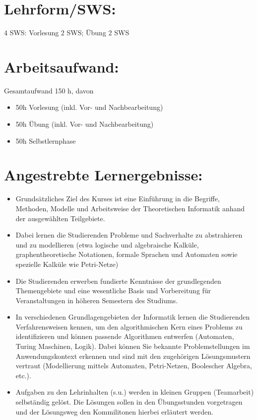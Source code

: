 \section*{Lehrform/SWS:}\label{lehrformsws-23}

4 SWS: Vorlesung 2 SWS; Übung 2 SWS

\section*{Arbeitsaufwand:}\label{arbeitsaufwand-22}

Gesamtaufwand 150 h, davon

\begin{itemize}
\item
  50h Vorlesung (inkl. Vor- und Nachbearbeitung)
\item
  50h Übung (inkl. Vor- und Nachbearbeitung)
\item
  50h Selbstlernphase
\end{itemize}

\section*{Angestrebte
Lernergebnisse:}\label{angestrebte-lernergebnisse-23}

\begin{itemize}
\item
  Grundsätzliches Ziel des Kurses ist eine Einführung in die Begriffe,
  Methoden, Modelle und Arbeitsweise der Theoretischen Informatik anhand
  der ausgewählten Teilgebiete.
\item
  Dabei lernen die Studierenden Probleme und Sachverhalte zu
  abstrahieren und zu modellieren (etwa logische und algebraische
  Kalküle, graphentheoretische Notationen, formale Sprachen und
  Automaten sowie spezielle Kalküle wie Petri-Netze)
\item
  Die Studierenden erwerben fundierte Kenntnisse der grundlegenden
  Themengebiete und eine wesentliche Basis und Vorbereitung für
  Veranstaltungen in höheren Semestern des Studiums.
\item
  In verschiedenen Grundlagengebieten der Informatik lernen die
  Studierenden Verfahrensweisen kennen, um den algorithmischen Kern
  eines Problems zu identifizieren und können passende Algorithmen
  entwerfen (Automaten, Turing Maschinen, Logik). Dabei können Sie
  bekannte Problemstellungen im Anwendungskontext erkennen und sind mit
  den zugehörigen Lösungsmustern vertraut (Modellierung mittels
  Automaten, Petri-Netzen, Boolescher Algebra, etc.).
\item
  Aufgaben zu den Lehrinhalten (s.u.) werden in kleinen Gruppen
  (Teamarbeit) selbständig gelöst. Die Lösungen sollen in den
  Übungsstunden vorgetragen und der Lösungsweg den Kommilitonen hierbei
  erläutert werden.
\end{itemize}

